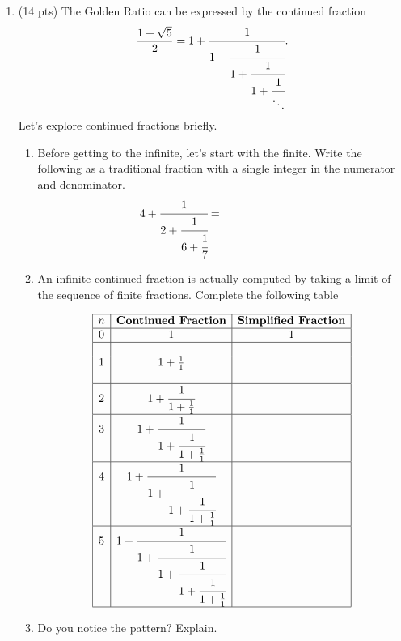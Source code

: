 \documentclass[12pt]{article}
\begin{document}
\begin{enumerate}
\begin{enumerate}
		\end{enumerate}
	\newpage
	\item (14 pts) The Golden Ratio can be expressed by the continued fraction
		\[\frac{1+\sqrt 5}{2}=1+\cfrac{1}{1+\cfrac{1}{1+\cfrac{1}{1+\cfrac{1}{\ddots}}}}.\]
		Let's explore continued fractions briefly.
		\begin{enumerate}
			\item Before getting to the infinite, let's start with the finite.
			 Write the following as a traditional fraction with a single integer in the numerator and denominator. 
			 $$\displaystyle 4+\cfrac{1}{2+\cfrac{1}{6+\cfrac{1}{7}}}=\hspace*{1in}\mbox{}$$

			 \item An infinite continued fraction is actually computed by taking a limit of the sequence of finite fractions.  Complete the following table
			 
			 	$$\begin{array}{|c|c|c|}
			 	\hline
			 	n&\textbf{Continued Fraction}&\textbf{Simplified Fraction}\\\hline
			 	0 & 1& 1\\\hline&&\\
			 	1 & 1+\frac{1}{1}&\\&&\\\hline
			 	2 & 1+\cfrac{1}{1+\frac{1}{1}}&\\\hline
			 	3 & 1+\cfrac{1}{1+\cfrac{1}{1+\frac{1}{1}}}&\\\hline
			 	4 & 1+\cfrac{1}{1+\cfrac{1}{1+\cfrac{1}{1+\frac{1}{1}}}}&\\\hline
			 	5 & 1+\cfrac{1}{1+\cfrac{1}{1+\cfrac{1}{1+\cfrac{1}{1+\frac{1}{1}}}}}&\\\hline
			 	\end{array}$$
			 \item Do you notice the pattern? Explain. 
		\end{enumerate}
	\end{enumerate}
		
\end{document}

